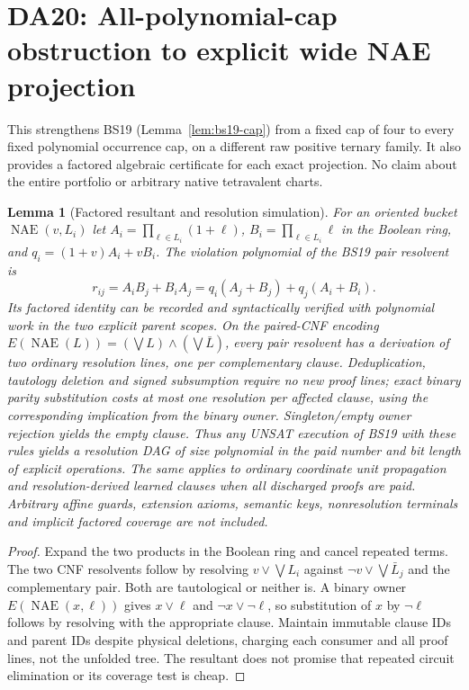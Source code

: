 \documentclass[11pt]{article}
\newtheorem{lemma}[theorem]{Lemma}
\begin{document}
\section{DA20: All-polynomial-cap obstruction to explicit wide NAE projection}\label{sec:da20}
This strengthens BS19 (Lemma~\ref{lem:bs19-cap}) from a fixed cap of four to every fixed polynomial occurrence cap, on a different raw positive ternary family. It also provides a factored algebraic certificate for each exact projection. No claim about the entire portfolio or arbitrary native tetravalent charts.

\begin{lemma}[Factored resultant and resolution simulation]\label{lem:da20-sim}
For an oriented bucket $\operatorname{NAE}(v,L_i)$ let $A_i=\prod_{\ell\in L_i}(1+\ell)$, $B_i=\prod_{\ell\in L_i}\ell$ in the Boolean ring, and $q_i=(1+v)A_i+vB_i$. The violation polynomial of the BS19 pair resolvent is
\[
r_{ij}=A_iB_j+B_iA_j=q_i(A_j+B_j)+q_j(A_i+B_i).
\]
Its factored identity can be recorded and syntactically verified with polynomial work in the two explicit parent scopes. On the paired-CNF encoding $E(\operatorname{NAE}(L))=(\bigvee L)\land(\bigvee\bar L)$, every pair resolvent has a derivation of two ordinary resolution lines, one per complementary clause. Deduplication, tautology deletion and signed subsumption require no new proof lines; exact binary parity substitution costs at most one resolution per affected clause, using the corresponding implication from the binary owner. Singleton/empty owner rejection yields the empty clause. Thus any UNSAT execution of BS19 with these rules yields a resolution DAG of size polynomial in the paid number and bit length of explicit operations. The same applies to ordinary coordinate unit propagation and resolution-derived learned clauses when all discharged proofs are paid. Arbitrary affine guards, extension axioms, semantic keys, nonresolution terminals and implicit factored coverage are not included.
\end{lemma}
\begin{proof}
Expand the two products in the Boolean ring and cancel repeated terms. The two CNF resolvents follow by resolving $v\vee\bigvee L_i$ against $\neg v\vee\bigvee\bar L_j$ and the complementary pair. Both are tautological or neither is. A binary owner $E(\operatorname{NAE}(x,\ell))$ gives $x\vee\ell$ and $\neg x\vee\neg\ell$, so substitution of $x$ by $\neg\ell$ follows by resolving with the appropriate clause. Maintain immutable clause IDs and parent IDs despite physical deletions, charging each consumer and all proof lines, not the unfolded tree. The resultant does not promise that repeated circuit elimination or its coverage test is cheap.
\end{proof}
\end{document}
